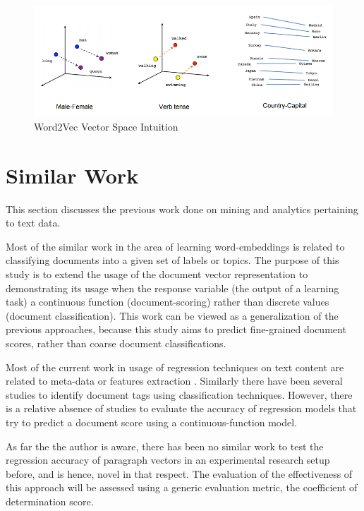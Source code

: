 \documentclass[conference]{IEEEtran}
\begin{document}
\begin{figure}[ht]
    \centering
    \includegraphics[width=\textwidth]{images/word2vec_1.png}
    \caption{Word2Vec Vector Space Intuition\cite{tensorflow_word2vec}}
    \label{fig:word2vec-vectorspace-intuition}
\end{figure}

\vspace{5mm}

\section{Similar Work}
    This section discusses the previous work done on mining and analytics pertaining to text data.

    Most of the similar work in the area of learning word-embeddings is related to classifying documents into a given set of labels or topics. 
    The purpose of this study is to extend the usage of the document vector representation to demonstrating its usage when the response variable (the output of a learning task) a continuous function (document-scoring) rather than discrete values (document classification). 
    This work can be viewed as a generalization of the previous approaches, because this study aims to predict fine-grained document scores, rather than coarse document classifications.

    Most of the current work in usage of regression techniques on text content are related to meta-data or features extraction \cite{su2015genetic}\cite{weissman2016natural}.
    Similarly there have been several studies to identify document tags using classification techniques\cite{bespalov2011sentiment}\cite{pang2002thumbs}. 
    However, there is a relative absence of studies to evaluate the accuracy of regression models that try to predict a document score using a continuous-function model.

    As far the the author is aware, there has been no similar work to test the regression accuracy of paragraph vectors in an experimental research setup before, and is hence, novel in that respect.
    The evaluation of the effectiveness of this approach will be assessed using a generic evaluation metric, the coefficient of determination score.
\end{document}
